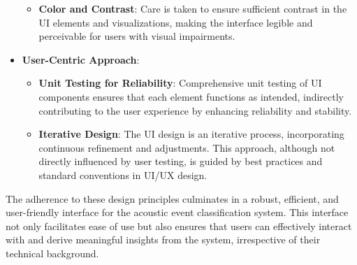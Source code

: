 \begin{itemize}
\begin{itemize}
          \item \textbf{Color and Contrast}: Care is taken to ensure sufficient contrast in the UI elements and visualizations, making the interface legible and perceivable for users with visual impairments.
        \end{itemize}
  \item \textbf{User-Centric Approach}: \begin{itemize}
          \item \textbf{Unit Testing for Reliability}: Comprehensive unit testing of UI components ensures that each element functions as intended, indirectly contributing to the user experience by enhancing reliability and stability.
          \item \textbf{Iterative Design}: The UI design is an iterative process, incorporating continuous refinement and adjustments. This approach, although not directly influenced by user testing, is guided by best practices and standard conventions in UI/UX design.
        \end{itemize}
\end{itemize}

The adherence to these design principles culminates in a robust, efficient, and user-friendly interface for the acoustic event classification system. This interface not only facilitates ease of use but also ensures that users can effectively interact with and derive meaningful insights from the system, irrespective of their technical background.

